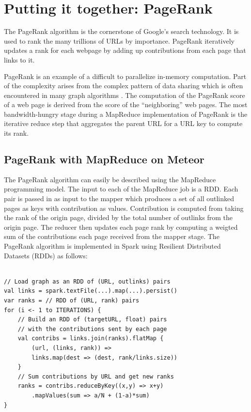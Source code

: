 \section{Putting it together: PageRank}
\label{sec:pagerank}


The PageRank algorithm is the cornerstone of Google's search technology\cite{pagerank}. It is used to rank the many trillions of URLs by importance. PageRank iteratively updates a rank for each webpage by adding up contributions from each page that links to it. 

PageRank is an example of a difficult to parallelize in-memory computation. Part of the complexity arises from the complex pattern of data sharing which is often encountered in many graph algorithms \cite{pagerank}. The computation of the PageRank score of a web page is derived from the score of the ``neighboring'' web pages. The most bandwidth-hungry stage during a MapReduce implementation of PageRank is the iterative reduce step that aggregates the parent URL for a URL key to compute its rank. 

\subsection{PageRank with MapReduce on Meteor}

The PageRank algorithm can easily be described using the MapReduce programming model. The input to each of the MapReduce job is a  RDD. Each pair is passed in as input to the mapper which produces a set of all outlinked pages as keys with contribution as values. Contribution is computed from taking the rank of the origin page, divided by the total number of outlinks from the origin page. The reducer then updates each page rank by computing a weigted sum of the contributions each page received from the mapper stage. The PageRank algorithm is implemented in Spark using Resilient Distributed Datasets (RDDs) \cite{rdd} as follows:

%
\begin{lstlisting}[label=mapreduce] 

// Load graph as an RDD of (URL, outlinks) pairs
val links = spark.textFile(...).map(...).persist()
var ranks = // RDD of (URL, rank) pairs
for (i <- 1 to ITERATIONS) {
    // Build an RDD of (targetURL, float) pairs
    // with the contributions sent by each page
    val contribs = links.join(ranks).flatMap {
        (url, (links, rank)) =>
        links.map(dest => (dest, rank/links.size))
    }
    // Sum contributions by URL and get new ranks
    ranks = contribs.reduceByKey((x,y) => x+y)
        .mapValues(sum => a/N + (1-a)*sum)
}

\end{lstlisting}
%

